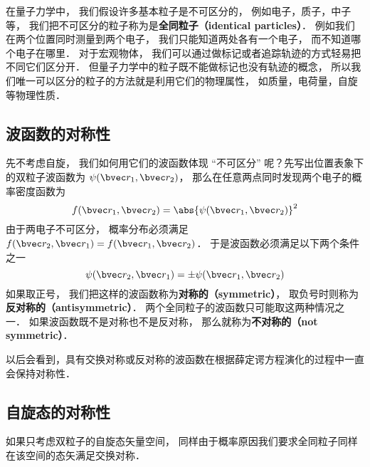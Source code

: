 
在量子力学中， 我们假设许多基本粒子是不可区分的， 例如电子，质子，中子等， 我们把不可区分的粒子称为是\textbf{全同粒子（identical particles）}． 例如我们在两个位置同时测量到两个电子， 我们只能知道两处各有一个电子， 而不知道哪个电子在哪里． 对于宏观物体， 我们可以通过做标记或者追踪轨迹的方式轻易把不同它们区分开． 但量子力学中的粒子既不能做标记也没有轨迹的概念， 所以我们唯一可以区分的粒子的方法就是利用它们的物理属性， 如质量，电荷量，自旋等物理性质．

\subsection{波函数的对称性}
先不考虑自旋， 我们如何用它们的波函数体现 “不可区分” 呢？先写出位置表象下的双粒子波函数为 $\psi(\bvec r_1, \bvec r_2)$， 那么在任意两点同时发现两个电子的概率密度函数为%
\begin{equation}
f(\bvec r_1, \bvec r_2) = \abs{\psi(\bvec r_1, \bvec r_2)}^2
\end{equation}
由于两电子不可区分， 概率分布必须满足 $f(\bvec r_2, \bvec r_1) = f(\bvec r_1, \bvec r_2)$． 于是波函数必须满足以下两个条件之一
\begin{equation}\label{IdPar_eq5}
\psi(\bvec r_2, \bvec r_1) = \pm \psi(\bvec r_1, \bvec r_2)
\end{equation}
如果取正号， 我们把这样的波函数称为\textbf{对称的（symmetric）}， 取负号时则称为\textbf{反对称的（antisymmetric）}． 两个全同粒子的波函数只可能取这两种情况之一． 如果波函数既不是对称也不是反对称， 那么就称为\textbf{不对称的（not symmetric）}．

以后会看到，具有交换对称或反对称的波函数在根据薛定谔方程演化的过程中一直会保持对称性． %

\subsection{自旋态的对称性}
如果只考虑双粒子的自旋态矢量空间， 同样由于概率原因我们要求全同粒子同样在该空间的态矢满足交换对称．

